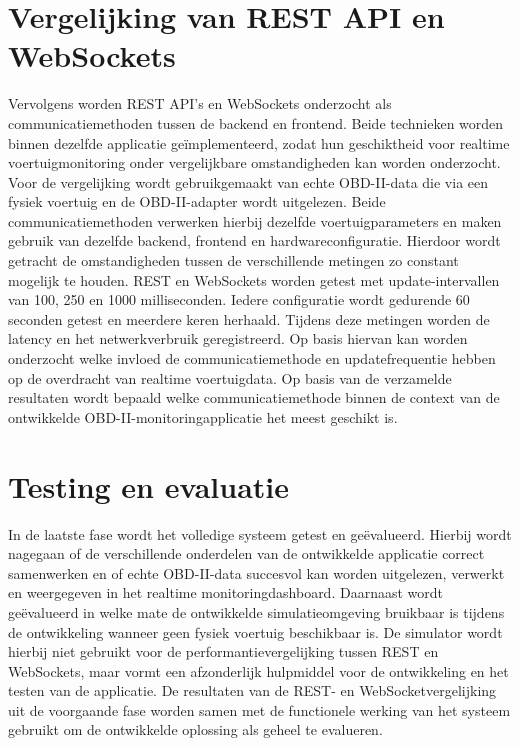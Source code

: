\section{Vergelijking van REST API en WebSockets}
Vervolgens worden REST API's en WebSockets onderzocht als communicatiemethoden tussen de backend en frontend. Beide technieken worden binnen dezelfde applicatie geïmplementeerd, zodat hun geschiktheid voor realtime voertuigmonitoring onder vergelijkbare omstandigheden kan worden onderzocht.
Voor de vergelijking wordt gebruikgemaakt van echte OBD-II-data die via een fysiek voertuig en de OBD-II-adapter wordt uitgelezen. Beide communicatiemethoden verwerken hierbij dezelfde voertuigparameters en maken gebruik van dezelfde backend, frontend en hardwareconfiguratie. Hierdoor wordt getracht de omstandigheden tussen de verschillende metingen zo constant mogelijk te houden.
REST en WebSockets worden getest met update-intervallen van 100, 250 en 1000 milliseconden. Iedere configuratie wordt gedurende 60 seconden getest en meerdere keren herhaald. Tijdens deze metingen worden de latency en het netwerkverbruik geregistreerd. Op basis hiervan kan worden onderzocht welke invloed de communicatiemethode en updatefrequentie hebben op de overdracht van realtime voertuigdata.
Op basis van de verzamelde resultaten wordt bepaald welke communicatiemethode binnen de context van de ontwikkelde OBD-II-monitoringapplicatie het meest geschikt is.

\section{Testing en evaluatie}
In de laatste fase wordt het volledige systeem getest en geëvalueerd. Hierbij wordt nagegaan of de verschillende onderdelen van de ontwikkelde applicatie correct samenwerken en of echte OBD-II-data succesvol kan worden uitgelezen, verwerkt en weergegeven in het realtime monitoringdashboard.
Daarnaast wordt geëvalueerd in welke mate de ontwikkelde simulatieomgeving bruikbaar is tijdens de ontwikkeling wanneer geen fysiek voertuig beschikbaar is. De simulator wordt hierbij niet gebruikt voor de performantievergelijking tussen REST en WebSockets, maar vormt een afzonderlijk hulpmiddel voor de ontwikkeling en het testen van de applicatie.
De resultaten van de REST- en WebSocketvergelijking uit de voorgaande fase worden samen met de functionele werking van het systeem gebruikt om de ontwikkelde oplossing als geheel te evalueren.